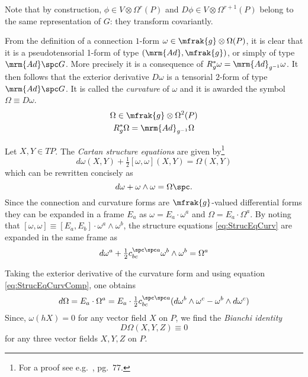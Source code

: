 \documentclass[10pt,reqno]{amsart}
\numberwithin{equation}{section}
\begin{document}
Note that by construction, $\phi \in V \otimes \Omega^r(P)$ and 
$D\phi \in V \otimes \Omega^{r+1}(P)$ belong to the same 
representation of $G$: they transform covariantly.

\blankline
From the definition of a connection $1$-form $\omega \in 
\mfrak{g} \otimes \Omega(P)$, it is clear that it is a 
pseudotensorial 1-form of type $(\mrm{Ad},\mfrak{g})$, or simply 
of type $\mrm{Ad}\spc G$. More precisely it is a consequence of 
$R_g^\ast \omega = \mrm{Ad}_{g^{-1}} \omega$. It then follows 
that the exterior derivative $D\omega$ is a tensorial $2$-form of 
type $\mrm{Ad}\spc G$. It is called the \emph{curvature} of 
$\omega$ and it is awarded the symbol $\Omega \equiv D\omega$.
%
\begin{gather*}
	\Omega \in \mfrak{g} \otimes \Omega^2(P) \\
	R_g^\ast \Omega = \mrm{Ad}_{g^{-1}} \Omega
\end{gather*}

Let $X,Y \in TP$. The \emph{Cartan structure equations} are given 
by\footnote{For a proof see e.g.\ \cite{kob1996found}, pg.\ 77.
}
%
\begin{equation}\label{eq:StrucEqCurv}
	d\omega(X,Y) + \tfrac{1}{2}[\omega,\omega](X,Y) = \Omega(X,Y)
\end{equation}
which can be rewritten concisely as
%
\begin{equation}
	d\omega + \omega \wedge \omega = \Omega \spc.
\end{equation}
%
Since the connection and curvature forms are $\mfrak{g}$-valued 
differential forms they can be expanded in a frame $E_a$ as 
$\omega = E_a \cdot \omega^a$ and $\Omega = E_a \cdot \Omega^a$.  
By noting that $[\omega,\omega] \equiv [E_a,E_b]\cdot \omega^a 
\wedge \omega^b$, the structure equations \eqref{eq:StrucEqCurv} 
are expanded in the same frame as
%
\begin{equation}\label{eq:StrucEqCurvComp}
	d\omega^a + \tfrac{1}{2} c_{bc}^{\spc\spc a} \omega^b \wedge 
	\omega^b = \Omega^a
\end{equation}

Taking the exterior derivative of the curvature form and using 
equation \eqref{eq:StrucEqCurvComp}, one obtains
%
\begin{displaymath}
	d\Omega = E_a \cdot \Omega^a
	= E_a \cdot \tfrac{1}{2} c_{bc}^{\spc\spc a}
	(d\omega^b \wedge \omega^c - \omega^b \wedge d\omega^c)
\end{displaymath}
%
Since, $\omega(hX) = 0$ for any vector field $X$ on $P$, we find 
the \emph{Bianchi identity}
%
\begin{equation}
	D\Omega(X,Y,Z) \equiv 0
\end{equation}
for any three vector fields $X, Y, Z$ on $P$.
\end{document}
